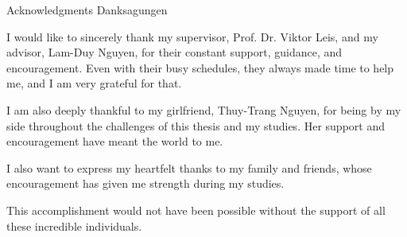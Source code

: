 \makeatletter
{}
{}
{}
\makeatother
\thispagestyle{empty}

\vspace*{20mm}

\begin{center}
\makeatletter
{}
{ Acknowledgments}
{ Danksagungen}
\makeatother
\end{center}

\vspace{10mm}

I would like to sincerely thank my supervisor, Prof. Dr. Viktor Leis, and my advisor, Lam-Duy Nguyen, for their constant support, guidance, and encouragement. Even with their busy schedules, they always made time to help me, and I am very grateful for that.

I am also deeply thankful to my girlfriend, Thuy-Trang Nguyen, for being by my side throughout the challenges of this thesis and my studies. Her support and encouragement have meant the world to me.

I also want to express my heartfelt thanks to my family and friends, whose encouragement has given me strength during my studies.

This accomplishment would not have been possible without the support of all these incredible individuals.

\cleardoublepage{}
